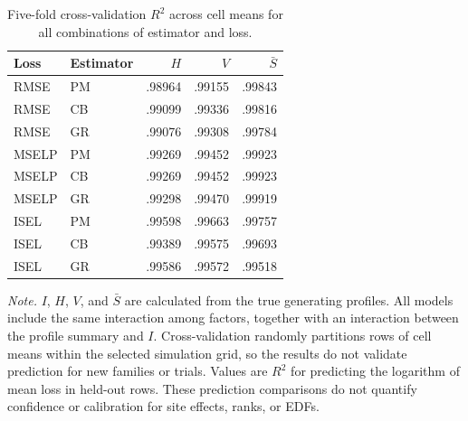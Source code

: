\begin{table}[!ht]
\caption{Five-fold cross-validation $R^2$ across cell means for all combinations of estimator and loss.}
\label{tab:F-fair}
\centering
\begin{tablebody}
\begin{tabular}{@{}llrrr@{}}
\toprule
Loss & Estimator & $H$ & $V$ & $\bar S$ \\
\midrule
RMSE & PM & .98964 & .99155 & .99843 \\
\addlinespace[5pt]
RMSE & CB & .99099 & .99336 & .99816 \\
\addlinespace[5pt]
RMSE & GR & .99076 & .99308 & .99784 \\
\addlinespace[9pt]
MSELP & PM & .99269 & .99452 & .99923 \\
\addlinespace[5pt]
MSELP & CB & .99269 & .99452 & .99923 \\
\addlinespace[5pt]
MSELP & GR & .99298 & .99470 & .99919 \\
\addlinespace[9pt]
ISEL & PM & .99598 & .99663 & .99757 \\
\addlinespace[5pt]
ISEL & CB & .99389 & .99575 & .99693 \\
\addlinespace[5pt]
ISEL & GR & .99586 & .99572 & .99518 \\
\bottomrule
\end{tabular}
\end{tablebody}
\par\vspace{0.4\baselineskip}
\begin{minipage}{\linewidth}\normalsize\doublespacing\raggedright
\textit{Note.} $I$, $H$, $V$, and $\bar S$ are calculated from the true generating profiles. All models include the same interaction among factors, together with an interaction between the profile summary and $I$. Cross-validation randomly partitions rows of cell means within the selected simulation grid, so the results do not validate prediction for new families or trials. Values are $R^2$ for predicting the logarithm of mean loss in held-out rows. These prediction comparisons do not quantify confidence or calibration for site effects, ranks, or EDFs.
\end{minipage}
\end{table}


